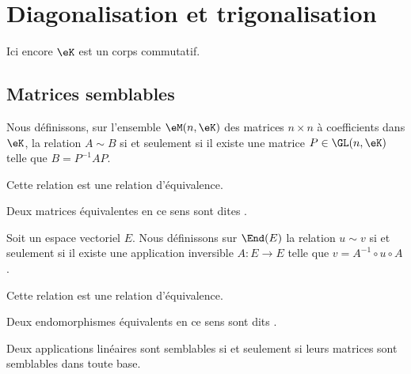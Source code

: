 

\section{Diagonalisation et trigonalisation}

Ici encore \( \eK\) est un corps commutatif.

\subsection{Matrices semblables}

\begin{propositionDef} \label{DefCQNFooSDhDpB}
    Nous définissons, sur l'ensemble \( \eM(n,\eK)\) des matrices \( n\times n\) à coefficients dans \(\eK\), la relation  \( A\sim B\) si et seulement si il existe une matrice \( P\in\GL(n,\eK)\) telle que \( B=P^{-1}AP\). 

    Cette relation est une relation d'équivalence.

    Deux matrices équivalentes en ce sens sont dites .
\end{propositionDef}

\begin{propositionDef}      \label{PROPooIXFSooZsFWHm}
    Soit un espace vectoriel \( E\). Nous définissons sur \( \End(E)\) la relation \( u\sim v\) si et seulement si il existe une application inversible \( A\colon E\to E\) telle que \( v=A^{-1}\circ u\circ A\).

    Cette relation est une relation d'équivalence.

    Deux endomorphismes équivalents en ce sens sont dits .
\end{propositionDef}

\begin{proposition}     \label{PROPooBGJBooXlDYEv}
    Deux applications linéaires sont semblables si et seulement si leurs matrices sont semblables dans toute base.
\end{proposition}


